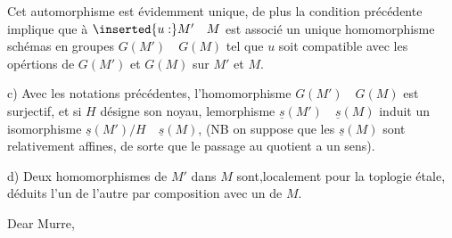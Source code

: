 Cet automorphisme est évidemment unique, de plus la condition précédente implique que à $\inserted{u:}M'\quad M$ est associé un unique homomorphisme  schémas en groupes $G(M')\quad G(M)$ tel que $u$ soit compatible avec les opértions de $G(M')$ et $G(M)$ sur $M'$ et $M$.

c) Avec les notations précédentes,  l'homomorphisme $G(M')\quad G(M)$ est surjectif, et si $H$ désigne son noyau, lemorphisme $\underline{s}(M')\quad\underline{s}(M)$ induit un  isomorphisme $\underline{s}(M')/H\quad\underline{s}(M)$,  (NB on suppose que les $\underline{s}(M)$ sont  relativement affines, de sorte que le passage au quotient a un sens).

d) Deux homomorphismes de $M'$ dans $M$ sont,localement pour la toplogie étale, déduits l'un de l'autre par composition avec un  de $M$.

Dear Murre,\\

